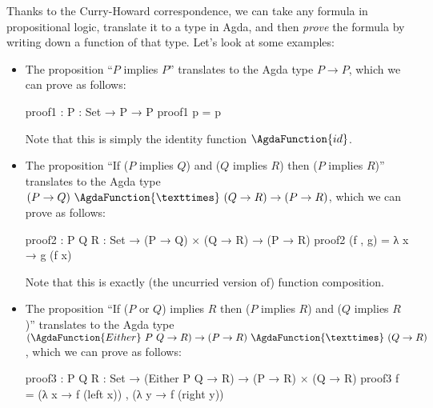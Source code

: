 \documentclass[a4paper,UKenglish]{tufte-handout}
\theoremstyle{definition}
\newtheorem{exercise}{Exercise}[section]
\newcommand\fun[1]{{\AgdaFunction{#1}}}
\newcommand\data[1]{{\AgdaFunction{#1}}}
\renewcommand\prod{\data{×}}
\begin{document}
Thanks to the Curry-Howard correspondence, we can take any formula in
propositional logic, translate it to a type in Agda, and then
\emph{prove} the formula by writing down a function of that
type. Let's look at some examples:
\begin{itemize}

\item The proposition ``$P$ implies $P$'' translates to the Agda type
$P \to P$, which we can prove as follows:
\begin{code}[number]
proof1 : {P : Set} → P → P
proof1 p = p
\end{code}
Note that this is simply the identity function $\fun{id}$.

\item The proposition ``If ($P$ implies $Q$) and ($Q$ implies $R$)
then ($P$ implies $R$)'' translates to the Agda type $(P \to Q)\
\prod\ (Q \to R) \to (P \to R)$, which we can prove as follows:
\begin{code}[number]
proof2 : {P Q R : Set}
       → (P → Q) × (Q → R) → (P → R)
proof2 (f , g) = λ x → g (f x)
\end{code}
Note that this is exactly (the uncurried version of) function composition.

\item The proposition ``If ($P$ or $Q$) implies $R$ then ($P$ implies
$R$) and ($Q$ implies $R$)'' translates to the Agda type
$(\data{Either}\ P\ Q \to R) \to (P \to R)\ \prod\ (Q \to R)$, which
we can prove as follows:
\begin{code}[number]
proof3 : {P Q R : Set}
       → (Either P Q → R) → (P → R) × (Q → R)
proof3 f = (λ x → f (left x)) , (λ y → f (right y))
\end{code}

\end{itemize}

\end{document}
